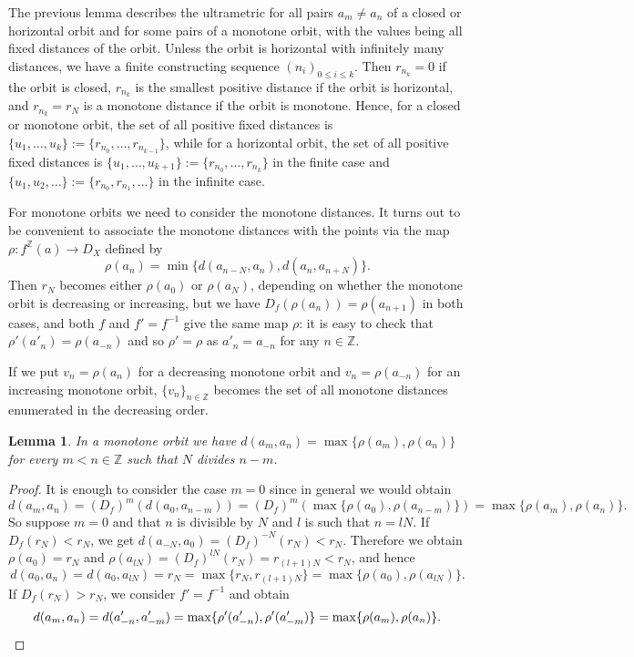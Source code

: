 \documentclass[oneside,notitlepage,12pt]{article}
\newtheorem{lm}[tw]{Lemma}
\theoremstyle{definition}
\theoremstyle{remark}
\newcommand \set [1]{\{#1\}}
\newcommand \maps {\colon} %
\newcommand \Z {\mathbb{Z}}
\begin{document}
The previous lemma describes the ultrametric for all pairs $a_m \neq a_n$ of a closed or horizontal orbit and for some pairs of a monotone orbit, with the values being all fixed distances of the orbit.
Unless the orbit is horizontal with infinitely many distances, we have a finite constructing sequence $(n_i)_{0 \leq i \leq k}$.
Then $r_{n_k} = 0$ if the orbit is closed, $r_{n_k}$ is the smallest positive distance if the orbit is horizontal, and $r_{n_k} = r_N$ is a monotone distance if the orbit is monotone.
Hence, for a closed or monotone orbit, the set of all positive fixed distances is $\set{u_1, \ldots, u_k} := \set{r_{n_0}, \ldots, r_{n_{k - 1}}}$, while for a horizontal orbit, the set of all positive fixed distances is $\set{u_1, \ldots, u_{k + 1}} := \set{r_{n_0}, \ldots, r_{n_k}}$ in the finite case and $\set{u_1, u_2, \ldots} := \set{r_{n_0}, r_{n_1}, \ldots}$ in the infinite case.

For monotone orbits we need to consider the monotone distances.
It turns out to be convenient to associate the monotone distances with the points via the map $\rho\maps f^\Z(a) \to D_X$ defined by
\[
    \rho(a_n) = \min\set{d(a_{n - N}, a_n), d(a_n, a_{n + N})}.
\]
Then $r_N$ becomes either $\rho(a_0)$ or $\rho(a_N)$, depending on whether the monotone orbit is decreasing or increasing, but we have $D_f(\rho(a_n)) = \rho(a_{n + 1})$ in both cases, and both $f$ and $f' = f^{-1}$ give the same map $\rho$: it is easy to check that $\rho'(a'_n) = \rho(a_{-n})$ and so $\rho' = \rho$ as $a'_n = a_{-n}$ for any $n \in \Z$.

If we put $v_n = \rho(a_n)$ for a decreasing monotone orbit and $v_n = \rho(a_{-n})$ for an increasing monotone orbit, $\set{v_n}_{n \in \Z}$ becomes the set of all monotone distances enumerated in the decreasing order.

\begin{lm} \label{thm:monotone_distances}
    In a monotone orbit we have $d(a_m, a_n) = \max\set{\rho(a_m), \rho(a_n)}$ for every $m < n \in \Z$ such that $N$ divides $n - m$.
\end{lm}
\begin{proof}
    It is enough to consider the case $m = 0$ since in general we would obtain 
    \[
        d(a_m, a_n) = (D_f)^m(d(a_0, a_{n - m})) = (D_f)^m(\max\set{\rho(a_0), \rho(a_{n - m})}) = \max\set{\rho(a_m), \rho(a_n)}.
    \]
    So suppose $m = 0$ and that $n$ is divisible by $N$ and $l$ is such that $n=lN$.
    If $D_f(r_N) < r_N$, we get $d(a_{-N},a_0)=(D_f)^{-N}(r_N)<r_N$. Therefore we obtain $\rho(a_0) = r_N$ and $\rho(a_{lN}) = (D_f)^{l N}(r_N) = r_{(l + 1) N} < r_N$, and hence 
    \[
        d(a_0, a_n) = d(a_0, a_{l N}) = r_N = \max\set{r_N, r_{(l + 1) N}} = \max\set{\rho(a_0), \rho(a_{l N})}.
    \]
    If $D_f(r_N) > r_N$, we consider $f' = f^{-1}$ and obtain
    \[
        d(a_m, a_n) = d(a'_{-n}, a'_{-m}) = \max\set{\rho'(a'_{-n}), \rho'(a'_{-m})} = \max\set{\rho(a_m), \rho(a_n)}.
        \qedhere
    \]
\end{proof}
\end{document}

